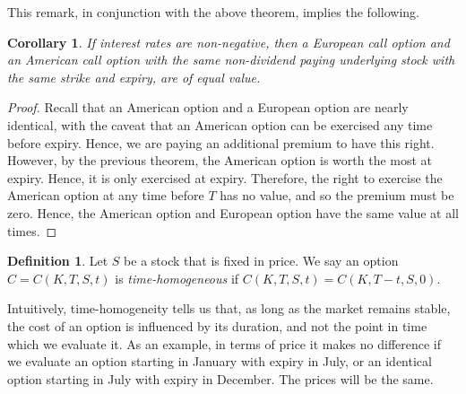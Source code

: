 \documentclass[12pt]{article}
\theoremstyle{plain}
\newtheorem{corollary}[theorem]{Corollary}
\theoremstyle{definition}
\newtheorem*{definition}{Definition}
\theoremstyle{remark}
\numberwithin{equation}{section}  %
\begin{document}
This remark, in conjunction with the above theorem, implies the following.
\begin{corollary}\label{cor:am-eu-equiv}
	If interest rates are non-negative, then a European call option and an 
	American call option with the same
	non-dividend paying underlying stock with the same strike and expiry, are 
	of equal value.
\end{corollary}
\begin{proof}
	Recall that an American option and a European option are nearly identical,
	with the caveat that an American option can be exercised any time before 
	expiry.
	Hence, we are paying an additional premium to have this right.
	However, by the previous theorem, the American option is worth the most at 
	expiry.
	Hence, it is only exercised at expiry. Therefore, the right to exercise
	the American option at any time before $T$ has no value, and so the premium
	must be zero. Hence, the American option and European option have the same 
	value at all times.
\end{proof}
\begin{definition}
	Let $S$ be a stock that is fixed in price.
	We say an option $C = C(K, T, S, t)$  is \emph{time-homogeneous} 
	if $C(K, T, S, t) = C(K, T-t, S, 0)$.
\end{definition}
Intuitively, time-homogeneity tells us that, as long as the market remains
stable, the cost of an option is influenced by its duration, and not the point
in time which we evaluate it. As an example, in terms of price it makes no difference if we evaluate an option starting in January with expiry in July, or an identical option starting in July with expiry in December.  The prices will be the same.
\end{document}
